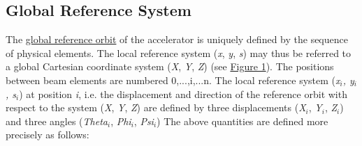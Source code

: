 




\subsection{Global Reference System}
 The \hyperlink{global}{global reference orbit} of the accelerator is uniquely defined by the sequence of physical elements. The local reference system (\textit{x}, \textit{y}, \textit{s}) may thus be referred to a global Cartesian coordinate system (\textit{X}, \textit{Y}, \textit{Z}) (see \hyperlink{global}{Figure 1}). The positions between beam elements are numbered 0,...,i,...n. The local reference system  (\textit{x$_i$, y$_i$, s$_i$}) at position \textit{i}, i.e. the displacement and direction of the reference orbit with respect to the system (\textit{X}, \textit{Y}, \textit{Z}) are defined by three displacements  (\textit{X$_i$}, \textit{Y$_i$}, \textit{Z$_i$}) and three angles (\textit{Theta$_i$}, \textit{Phi$_i$}, \textit{Psi$_i$}) The above quantities are defined more precisely as follows: 
